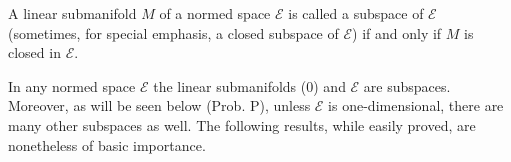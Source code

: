 A linear submanifold $M$ of a normed space $\mathcal{E}$ is called a subspace of $\mathcal{E}$ (sometimes, for special emphasis, a closed subspace of $\mathcal{E}$) if and only if $M$ is closed in $\mathcal{E}$.

In any normed space $\mathcal{E}$ the linear submanifolds (0) and $\mathcal{E}$ are subspaces. Moreover, as will be seen below (Prob. P), unless $\mathcal{E}$ is one-dimensional, there are many other subspaces as well. The following results, while easily proved, are nonetheless of basic importance.
